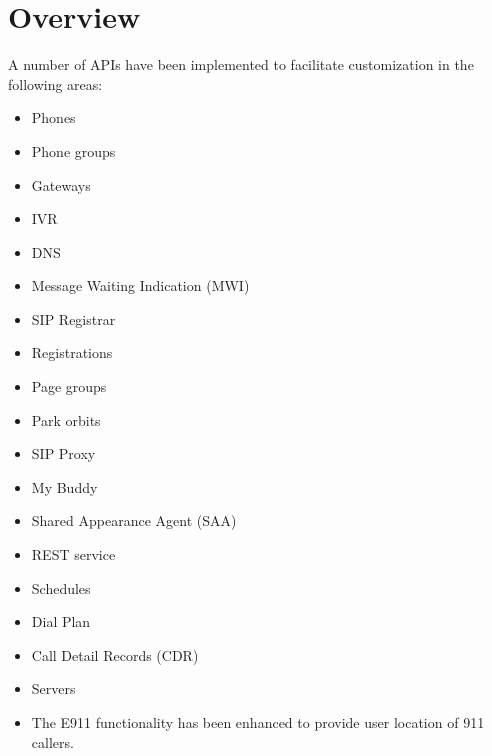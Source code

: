 \documentclass[letterpaper,10pt,english]{sphinxmanual}
\begin{document}
\section{Overview}
\label{\detokenize{restapi:overview}}
A number of APIs have been implemented to facilitate customization in the following areas:
\begin{itemize}
\item {} 
Phones

\item {} 
Phone groups

\item {} 
Gateways

\item {} 
IVR

\item {} 
DNS

\item {} 
Message Waiting Indication (MWI)

\item {} 
SIP Registrar

\item {} 
Registrations

\item {} 
Page groups

\item {} 
Park orbits

\item {} 
SIP Proxy

\item {} 
My Buddy

\item {} 
Shared Appearance Agent (SAA)

\item {} 
REST service

\item {} 
Schedules

\item {} 
Dial Plan

\item {} 
Call Detail Records (CDR)

\item {} 
Servers

\item {} 
The E911 functionality has been enhanced to provide user location of 911 callers.

\end{itemize}
\end{document}
